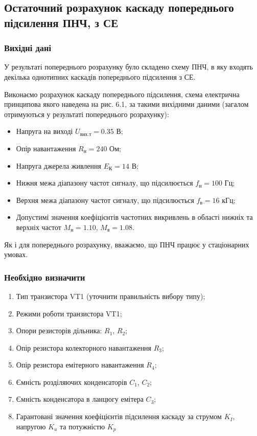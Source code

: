 \documentclass[main.tex]{subfiles}
\begin{document}
\subsection{Остаточний розрахунок каскаду попереднього підсилення ПНЧ, з СЕ}

\subsubsection{Вихідні дані}

У результаті попереднього розрахунку було складено схему ПНЧ, в яку входять декілька однотипних каскадів попереднього підсилення з СЕ. 

Виконаємо розрахунок каскаду попереднього підсилення, схема електрична принципова якого наведена на рис. 6.1, за такими вихідними даними (загалом отримуються у результаті попереднього розрахунку):

\begin{itemize}
    \item Напруга на виході $U_{\text{вих.т}} = 0.35$ В;
    \item Опір навантаження $R_{\text{н}} = 240$ Ом;
    \item Напруга джерела живлення $E_{\text{К}} = 14$ В;
    \item Нижня межа діапазону частот сигналу, що підсилюється $f_{\text{н}} = 100$ Гц;
    \item Верхня межа діапазону частот сигналу, що підсилюється $f_{\text{в}} = 16$ кГц;
    \item Допустимі значення коефіцієнтів частотних викривлень в області нижніх та верхніх частот $M_{\text{н}} = 1.10$, $M_{\text{в}} = 1.08$.
\end{itemize}

Як і для попереднього розрахунку, вважаємо, що ПНЧ працює у стаціонарних умовах.

\subsubsection{Необхідно визначити}

\begin{enumerate}
    \item Тип транзистора VT1 (уточнити правильність вибору типу);
    \item Режими роботи транзистора VT1;
    \item Опори резисторів дільника: $R_1$, $R_2$;
    \item Опір резистора колекторного навантаження $R_3$;
    \item Опір резистора емітерного навантаження $R_4$;
    \item Ємність розділяючих конденсаторів $C_1$, $C_2$;
    \item Ємність конденсатора в ланцюгу емітера $C_3$;
    \item Гарантовані значення коефіцієнтів підсилення каскаду за струмом $K_I$, напругою $K_u$ та потужністю $K_p$
\end{enumerate}
\end{document}
